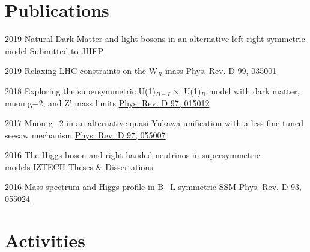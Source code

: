 \documentclass[]{friggeri-cv}
\begin{document}
\section{Publications}

\begin{entrylist}
	
	\entry
	{2019}
	{Natural Dark Matter and light bosons in an alternative left-right symmetric model}
	{\href{https://arxiv.org/pdf/1911.12883.pdf}{Submitted to JHEP}} 
	
	
	\entry
	{2019}
	{Relaxing LHC constraints on the W$_R$ mass}
	{\href{https://journals.aps.org/prd/abstract/10.1103/PhysRevD.99.035001}{Phys. Rev. D 99, 035001}} 
	
	
	\entry
	{2018}
	{Exploring the supersymmetric U(1)$_{B-L} \times$ U(1)$_R$ model with dark matter, muon g−2, and Z' mass limits}
	{\href{https://journals.aps.org/prd/abstract/10.1103/PhysRevD.97.015012}{Phys. Rev. D 97, 015012}} 
	
	\entry
	{2017}
	{Muon g−2 in an alternative quasi-Yukawa unification with a less fine-tuned seesaw mechanism}
	{\href{http://journals.aps.org/prd/abstract/10.1103/PhysRevD.97.055007}{Phys. Rev. D 97, 055007}} 
	
	\entry
	{2016}
	{The Higgs boson and right-handed neutrinos in supersymmetric \\ models}
	{\href{http://openaccess.iyte.edu.tr/xmlui/handle/11147/2842}{IZTECH Theses \& Dissertations}} 
	
	\entry
	{2016}
	{Mass spectrum and Higgs profile in B−L symmetric SSM}
	{\href{http://journals.aps.org/prd/abstract/10.1103/PhysRevD.93.055024}{Phys. Rev. D 93, 055024}} 
	
\end{entrylist}

\section{Activities}
\end{document}
